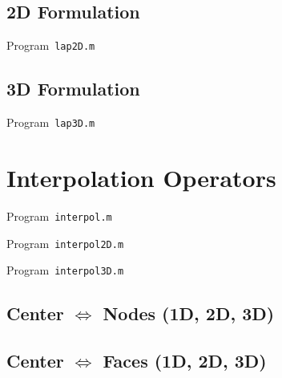 \subsection{2D Formulation}

\begin{listing}[ht!]
	\tiny
	\centering
	\caption{Program~\texttt{lap2D.m}}
	\label{code:lap2D.m}
\end{listing}

\subsection{3D Formulation}

\begin{listing}[ht!]
	\tiny
	\centering
	\caption{Program~\texttt{lap3D.m}}
	\label{code:lap3D.m}
\end{listing}

\section{Interpolation Operators}

\begin{listing}[ht!]
	\tiny
	\centering
	\caption{Program~\texttt{interpol.m}}
	\label{code:interpol.m}
\end{listing}

\begin{listing}[ht!]
	\tiny
	\centering
	\caption{Program~\texttt{interpol2D.m}}
	\label{code:interpol2D.m}
\end{listing}

\begin{listing}[ht!]
	\tiny
	\centering
	\caption{Program~\texttt{interpol3D.m}}
	\label{code:interpol3D.m}
\end{listing}

\subsection{Center $\Longleftrightarrow$ Nodes (1D, 2D, 3D)}
\subsection{Center $\Longleftrightarrow$ Faces (1D, 2D, 3D)}
